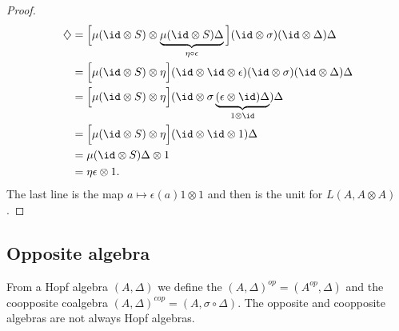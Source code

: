 \begin{proof}
\begin{subequations}
        \begin{align}
            \diamondsuit&=\Big[ \mu(\id\otimes S)\otimes \underbrace{\mu(\id\otimes S)\Delta}_{\eta\circ\epsilon} \Big](\id\otimes\sigma)(\id\otimes\Delta)\Delta\\
            &=\Big[ \mu(\id\otimes S)\otimes\eta \Big](\id\otimes\id\otimes\epsilon)(\id\otimes\sigma)(\id\otimes\Delta)\Delta\\
            &=\Big[ \mu(\id\otimes S)\otimes\eta \Big](\id\otimes \sigma\underbrace{(\epsilon\otimes\id)\Delta}_{1\otimes\id} )\Delta\\
            &=\Big[ \mu(\id\otimes S)\otimes\eta \Big](\id\otimes\id\otimes 1)\Delta\\
            &=\mu(\id\otimes S)\Delta\otimes 1\\
            &=\eta\epsilon\otimes 1.
        \end{align}
    \end{subequations}
    The last line is the map \( a\mapsto \epsilon(a)1\otimes 1\) and then is the unit for \( L(A,A\otimes A)\).   
\end{proof}

\subsection{Opposite algebra}

From a Hopf algebra \( (A,\Delta)\) we define the  \( (A,\Delta)^{op}=(A^{op},\Delta)\) and the coopposite coalgebra \( (A,\Delta)^{cop}=(A,\sigma\circ\Delta)\). The opposite and coopposite algebras are not always Hopf algebras.

